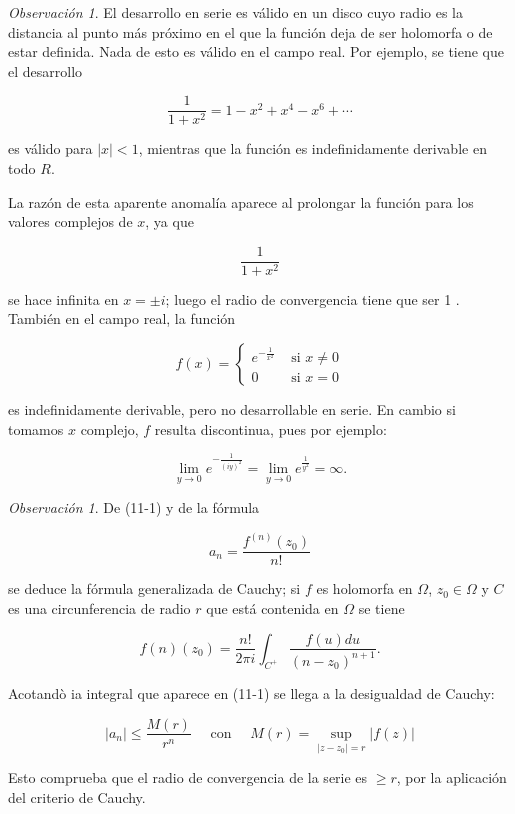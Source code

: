 \documentclass[10pt]{article}
\theoremstyle{plain}
\theoremstyle{definition}
\theoremstyle{remark}
\newtheorem{remark}[theorem]{Observación}
\begin{document}
\begin{remark}
El desarrollo en serie es válido en un disco cuyo radio es la distancia al punto más próximo en el que la función deja de ser holomorfa o de estar definida. Nada de esto es válido en el campo real. Por ejemplo, se tiene que el desarrollo

  $$
  \frac{1}{1+x^{2}}=1-x^{2}+x^{4}-x^{6}+\cdots
  $$

  es válido para $|x|<1$, mientras que la función es indefinidamente derivable en todo $R$.

  La razón de esta aparente anomalía aparece al prolongar la función para los valores complejos de $x$, ya que

  $$
  \frac{1}{1+x^{2}}
  $$

  se hace infinita en $x= \pm i$; luego el radio de convergencia tiene que ser 1 .\\
  También en el campo real, la función

  $$
  f(x)= \begin{cases}e^{-\frac{1}{x^{2}}} & \text { si } x \neq 0 \\ 0 & \text { si } x=0\end{cases}
  $$

  es indefinidamente derivable, pero no desarrollable en serie. En cambio si tomamos $x$ complejo, $f$ resulta discontinua, pues por ejemplo:

  $$
  \lim _{y \rightarrow 0} e^{-\frac{1}{(i y)^{2}}}=\lim _{y \rightarrow 0} e^{\frac{1}{y^{2}}}=\infty .
  $$
\end{remark}


\begin{remark}
De (11-1) y de la fórmula

  $$
  a_{n}=\frac{f^{(n)}\left(z_{0}\right)}{n!}
  $$

  se deduce la fórmula generalizada de Cauchy; si $f$ es holomorfa en $\Omega$, $z_{0} \in \Omega$ y $C$ es una circunferencia de radio $r$ que está contenida en $\Omega$ se tiene


  \begin{equation*}
  f(n)\left(z_{0}\right)=\frac{n!}{2 \pi i} \int_{C^{+}} \frac{f(u) d u}{\left(n-z_{0}\right)^{n+1}} . \tag{11-2}
  \end{equation*}


  Acotandò ia integral que aparece en (11-1) se llega a la desigualdad de Cauchy:


  \begin{equation*}
  \left|a_{n}\right| \leqslant \frac{M(r)}{r^{n}} \quad \text { con } \quad M(r)=\sup _{\left|z-z_{0}\right|=r}|f(z)| \tag{11-3}
  \end{equation*}


  Esto comprueba que el radio de convergencia de la serie es $\geqslant r$, por la aplicación del criterio de Cauchy.
\end{remark}
\end{document}
